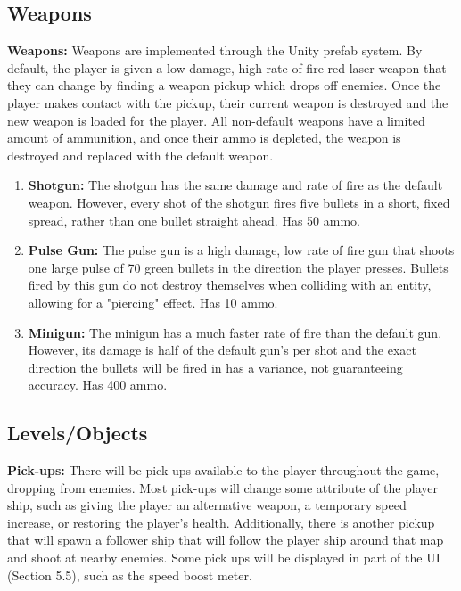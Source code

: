 \documentclass[12pt]{article}       %
\begin{document}
\subsection{Weapons} %

	{\bf Weapons:} Weapons are implemented through the Unity prefab system. By default, the player is given a low-damage, high rate-of-fire red laser weapon that they can change by finding a weapon pickup which drops off enemies. Once the player makes contact with the pickup, their current weapon is destroyed and the new weapon is loaded for the player. All non-default weapons have a limited amount of ammunition, and once their ammo is depleted, the weapon is destroyed and replaced with the default weapon.

	\begin{enumerate}
	\item {\bf Shotgun:} The shotgun has the same damage and rate of fire as the default weapon. However, every shot of the shotgun fires five bullets in a short, fixed spread, rather than one bullet straight ahead. Has 50 ammo.

	\item {\bf Pulse Gun:} The pulse gun is a high damage, low rate of fire gun that shoots one large pulse of 70 green bullets in the direction the player presses. Bullets fired by this gun do not destroy themselves when colliding with an entity, allowing for a "piercing" effect. Has 10 ammo.

	\item {\bf Minigun:} The minigun has a much faster rate of fire than the default gun. However, its damage is half of the default gun's per shot and the exact direction the bullets will be fired in has a variance, not guaranteeing accuracy. Has 400 ammo.
	\end{enumerate}


\subsection{Levels/Objects} %

	{\bf Pick-ups:}  There will be pick-ups available to the player throughout the game, dropping from enemies. Most pick-ups will change some attribute of the player ship, such as giving the player an alternative weapon, a temporary speed increase, or restoring the player's health. Additionally, there is another pickup that will spawn a follower ship that will follow the player ship around that map and shoot at nearby enemies. Some pick ups will be displayed in part of the UI (Section 5.5), such as the speed boost meter.
\end{document}
